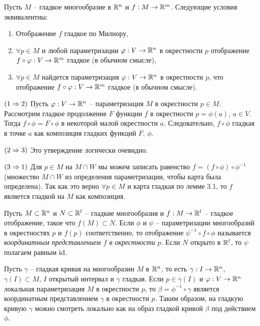 
\begin{lemma}
	Пусть $M$ -- гладкое многообразие в $\mathbb{R}^n$ и $f : M \to \mathbb{R}^m$. Следующие условия эквивалентны:
	\begin{enumerate}[itemsep = 0pt, topsep = 5pt]
		\item Отображение $f$ гладкое по Милнору,
		\item $\forall p \in M$ и любой параметризации $\varphi : V \to \mathbb{R}^n$ в окрестности $p$ отображение $f \circ \varphi : V \to \mathbb{R}^m$ гладкое (в обычном смысле),
		\item $\forall p \in M$ найдется параметризация $\varphi : V \to \mathbb{R}^n$ в окрестности $p$, что отображение $f \circ \varphi : V \to \mathbb{R}^m$ гладкое (в обычном смысле).
	\end{enumerate}
\end{lemma}

\begin{myproof}
	$(1 \Rightarrow 2)$ Пусть $\varphi : V \to \mathbb{R}^n$ -- параметризация $M$ в окрестности $p \in M$. 
	Рассмотрим гладкое продолжение $F$ функции $f$ в окрестности $p = \phi(a)$, $a \in V$. 
	Тогда $f \circ \phi = F \circ \phi$ в некоторой малой окрестности $a$. 
	Следовательно, $f \circ \phi$ гладкая в точке $a$ как композиция гладких функций $F$, $\phi$. 

	\vspace{5pt}
	$(2 \Rightarrow 3)$ Это утверждение логически очевидно.

	\vspace{5pt}
	$(3 \Rightarrow 1)$ Для $p \in M$ на $M \cap W$ мы можем записать равенство $f = (f \circ \phi) \circ \phi^{-1}$ (множество $M \cap W$ из определения параметризации, чтобы карта была определена). 
	Так как это верно $\forall p \in M$ и карта гладкая по лемме 3.1, то $f$ является гладкой на $M$ как композиция.
\end{myproof}

\begin{note}
	Пусть $M \subset \mathbb{R}^n$ и $N \subset \mathbb{R}^l$ -- гладкие многообразия и $f : M \to \mathbb{R}^l$ -- гладкое отображение, такое что $f(M) \subset N$. 
	Если $\phi$ и $\psi$ -- параметризации многообразий в окрестностях $p$ и $f(p)$ соответственно,
	то отображение $\psi^{-1} \circ f \circ \phi$ называется \textit{координатным представлением $f$ в окрестности $p$}. 
	Если $N$ открыто в $\mathbb{R}^l$, то $\psi$ полагаем равным $\mathrm{id}$.
\end{note}

\begin{example}
	Пусть $\gamma$ -- гладкая кривая на многообразии $M$ в $\mathbb{R}^n$, то есть 
	$\gamma : I \to \mathbb{R}^n$, $\gamma(I) \subset M$, $I$ открытый интервал и $\gamma$ гладкая.
	Если $p \in \gamma(I)$ и $\varphi : V \to \mathbb{R}^n$ локальная параметризация $M$ в окрестности $p$, то $\beta = \phi^{-1} \circ \gamma$ является координатным представлением $\gamma$ в окрестности $p$. 
	Таким образом, на гладкую кривую $\gamma$ можно смотреть локально как на образ гладкой кривой $\beta$ под действием $\phi$.  
\end{example}


